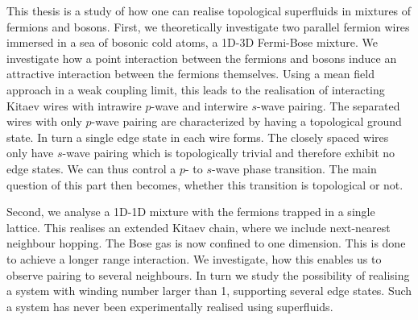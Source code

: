 \newpage
This thesis is a study of how one can realise topological superfluids in mixtures of fermions and bosons. First, we theoretically investigate two parallel fermion wires immersed in a sea of bosonic cold atoms, a 1D-3D Fermi-Bose mixture. We investigate how a point interaction between the fermions and bosons induce an attractive interaction between the fermions themselves. Using a mean field approach in a weak coupling limit, this leads to the realisation of interacting Kitaev wires with intrawire $p$-wave and interwire $s$-wave pairing. The separated wires with only $p$-wave pairing are characterized by having a topological ground state. In turn a single edge state in each wire forms. The closely spaced wires only have $s$-wave pairing which is topologically trivial and therefore exhibit no edge states. We can thus control a $p$- to $s$-wave phase transition. The main question of this part then becomes, whether this transition is topological or not. 

Second, we analyse a 1D-1D mixture with the fermions trapped in a single lattice. This realises an extended Kitaev chain, where we include next-nearest neighbour hopping. The Bose gas is now confined to one dimension. This is done to achieve a longer range interaction. We investigate, how this enables us to observe pairing to several neighbours. In turn we study the possibility of realising a system with winding number larger than 1, supporting several edge states. Such a system has never been experimentally realised using superfluids. 

